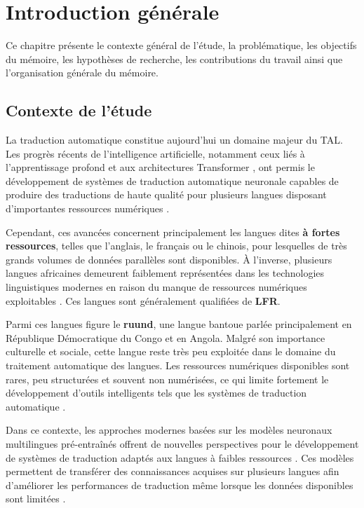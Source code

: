 \chapter{Introduction générale}

Ce chapitre présente le contexte général de l'étude, la problématique, les objectifs du mémoire, les hypothèses de recherche, les contributions du travail ainsi que l'organisation générale du mémoire.

\section{Contexte de l'étude}

La traduction automatique constitue aujourd'hui un domaine majeur du \ac{TAL}. Les progrès récents de l'intelligence artificielle, notamment ceux liés à l'apprentissage profond et aux architectures Transformer \cite{vaswani2017attention}, ont permis le développement de systèmes de traduction automatique neuronale capables de produire des traductions de haute qualité pour plusieurs langues disposant d'importantes ressources numériques \cite{ranathunga2023neural}.

Cependant, ces avancées concernent principalement les langues dites \textbf{à fortes ressources}, telles que l'anglais, le français ou le chinois, pour lesquelles de très grands volumes de données parallèles sont disponibles. À l'inverse, plusieurs langues africaines demeurent faiblement représentées dans les technologies linguistiques modernes en raison du manque de ressources numériques exploitables \cite{agyei2024low, ranathunga2023neural}. Ces langues sont généralement qualifiées de \textbf{\ac{LFR}}.

Parmi ces langues figure le \textbf{ruund}, une langue bantoue parlée principalement en République Démocratique du Congo et en Angola. Malgré son importance culturelle et sociale, cette langue reste très peu exploitée dans le domaine du traitement automatique des langues. Les ressources numériques disponibles sont rares, peu structurées et souvent non numérisées, ce qui limite fortement le développement d'outils intelligents tels que les systèmes de traduction automatique \cite{haulai2023construction, jindal2017building}.

Dans ce contexte, les approches modernes basées sur les modèles neuronaux multilingues pré-entraînés offrent de nouvelles perspectives pour le développement de systèmes de traduction adaptés aux langues à faibles ressources \cite{rakhimov2024enhancing, lalrempuii2023investigating}. Ces modèles permettent de transférer des connaissances acquises sur plusieurs langues afin d'améliorer les performances de traduction même lorsque les données disponibles sont limitées \cite{nguyen2017transfer, ma2025dongba}.

